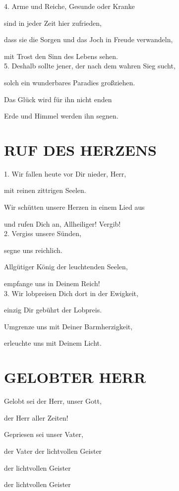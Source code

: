 \documentclass[11pt,a5paper,twoside]{article}
\begin{document}
4. Arme und Reiche, Gesunde oder Kranke

sind in jeder Zeit hier zufrieden, 

dass sie die Sorgen und das Joch in Freude verwandeln, 

mit Trost den Sinn des Lebens sehen.\\


5. Deshalb sollte jener, der nach dem wahren Sieg sucht,

solch ein wunderbares Paradies großziehen. 

Das Glück wird für ihn nicht enden 

Erde und Himmel werden ihn segnen.

\section[Ruf des Herzens]{RUF DES HERZENS}

1. Wir fallen heute vor Dir nieder, Herr, 

mit reinen zittrigen Seelen.

Wir schütten unsere Herzen in einem Lied aus 

und rufen Dich an, Allheiliger! Vergib!\\

2. Vergiss unsere Sünden, 

segne uns reichlich.

Allgütiger König der leuchtenden Seelen,

empfange uns in Deinem Reich!\\

3. Wir lobpreisen Dich dort in der Ewigkeit,

einzig Dir gebührt der Lobpreis.

Umgrenze uns mit Deiner Barmherzigkeit,

erleuchte uns mit Deinem Licht.\\


\section[Gelobter Herr]{GELOBTER HERR}

Gelobt sei der Herr, unser Gott,

der Herr aller Zeiten!

Gepriesen sei unser Vater,

der Vater der lichtvollen Geister

der lichtvollen Geister

der lichtvollen Geister
\end{document}
